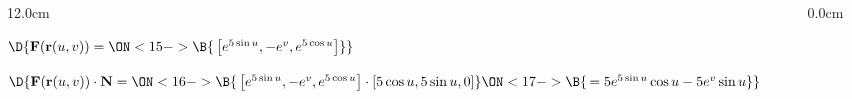 \begin{frame}
\begin{columns}
\begin{column}{12.0cm}
\vspace{0.4cm}

$\D{{\bf F}({\bf r}(u,v)) = 
\ON<15->{\B{\,\left[e^{5\sin u}, -e^{v}, e^{5\cos u}\right]}}}$

\vspace{0.3cm}

$\D{{\bf F}({\bf r}(u,v)) \cdot {\bf N} = 
\ON<16->{\B{\,\left[e^{5\sin u}, -e^{v}, e^{5\cos u}\right] \cdot [5\cos u,5\sin u,0]}}
\ON<17->{\B{\, = 5e^{5\sin u}\cos u - 5e^v\sin u}}}$

\vspace{2.8cm}

	
\end{column}\begin{column}{0.0cm}\end{column}\end{columns}
\end{frame}

